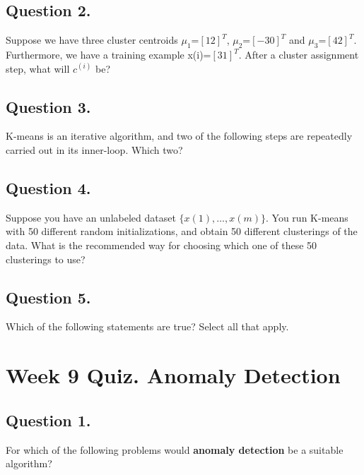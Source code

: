 \documentclass[11pt]{article} %
\begin{document}
\subsection*{Question 2.} 
Suppose we have three cluster centroids $\mu_1$=$[1 2]^T$, $\mu_2$=$[-3 0]^T$ and $\mu_3$=$[4 2]^T$. 
Furthermore, we have a training example x(i)=$[3 1]^T$. After a cluster assignment step, what will $c^{(i)}$ be?


\subsection*{Question 3.}
K-means is an iterative algorithm, and two of the following steps are repeatedly carried out in its inner-loop. Which two?


\subsection*{Question 4. }
Suppose you have an unlabeled dataset $\{x(1),\ldots,x(m)\}$. You run K-means with 50 different random
initializations, and obtain 50 different clusterings of the data. 
What is the recommended way for choosing which one of these 50 clusterings to use?

\subsection*{Question 5. }
Which of the following statements are true? Select all that apply.



\newpage
\section{Week 9 Quiz. Anomaly Detection}

\subsection*{Question 1. }
For which of the following problems would \textbf{anomaly detection} be a suitable algorithm?
\end{document}
